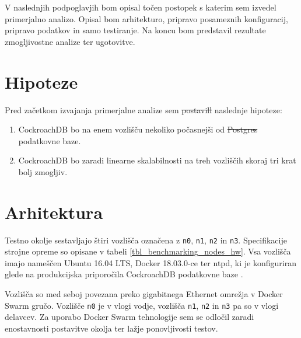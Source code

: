 \documentclass[a4paper, 12pt]{book}
\providecommand{\DIFaddtex}[1]{{\protect\color{blue}\uwave{#1}}} %
\providecommand{\DIFdeltex}[1]{{\protect\color{red}\sout{#1}}}                      %
\providecommand{\DIFaddbegin}{} %
\providecommand{\DIFaddend}{} %
\providecommand{\DIFdelbegin}{} %
\providecommand{\DIFdelend}{} %
\providecommand{\DIFadd}[1]{\texorpdfstring{\DIFaddtex{#1}}{#1}} %
\providecommand{\DIFdel}[1]{\texorpdfstring{\DIFdeltex{#1}}{}} %
\newcommand{\DIFscaledelfig}{0.5}
\newlength{\DIFdelgraphicswidth} %
\newlength{\DIFdelgraphicsheight} %
\newcommand{\DIFaddincludegraphics}[2][]{{\color{blue}\fbox{\DIFOincludegraphics[#1]{#2}}}} %
\newcommand{\DIFdelincludegraphics}[2][]{%
\sbox{\DIFdelgraphicsbox}{\DIFOincludegraphics[#1]{#2}}%
\settoboxwidth{\DIFdelgraphicswidth}{\DIFdelgraphicsbox} %
\settoboxtotalheight{\DIFdelgraphicsheight}{\DIFdelgraphicsbox} %
\scalebox{\DIFscaledelfig}{%
\parbox[b]{\DIFdelgraphicswidth}{\usebox{\DIFdelgraphicsbox}\\[-\baselineskip] \rule{\DIFdelgraphicswidth}{0em}}\llap{\resizebox{\DIFdelgraphicswidth}{\DIFdelgraphicsheight}{%
\setlength{\unitlength}{\DIFdelgraphicswidth}%
\begin{picture}(1,1)%
\thicklines\linethickness{2pt} %
{\color[rgb]{1,0,0}\put(0,0){\framebox(1,1){}}}%
{\color[rgb]{1,0,0}\put(0,0){\line( 1,1){1}}}%
{\color[rgb]{1,0,0}\put(0,1){\line(1,-1){1}}}%
\end{picture}%
}\hspace*{3pt}}} %
} %
\DeclareRobustCommand{\DIFaddbegin}{\DIFOaddbegin \let\includegraphics\DIFaddincludegraphics} %
\DeclareRobustCommand{\DIFaddend}{\DIFOaddend \let\includegraphics\DIFOincludegraphics} %
\DeclareRobustCommand{\DIFdelbegin}{\DIFOdelbegin \let\includegraphics\DIFdelincludegraphics} %
\DeclareRobustCommand{\DIFdelend}{\DIFOaddend \let\includegraphics\DIFOincludegraphics} %
\begin{document}
V naslednjih podpoglavjih bom opisal točen postopek s katerim sem izvedel primerjalno analizo. Opisal bom arhitekturo, pripravo posameznih konfiguracij, pripravo podatkov in samo testiranje. Na koncu bom predstavil rezultate zmogljivostne analize ter ugotovitve.
\DIFdelbegin %
\DIFdelend 

\section{Hipoteze}
Pred začetkom izvajanja primerjalne analize sem \DIFdelbegin \DIFdel{postavill }\DIFdelend \DIFaddbegin \DIFadd{postavil }\DIFaddend naslednje hipoteze:
\begin{enumerate}
    \item CockroachDB bo na enem vozlišču nekoliko počasnejši od \DIFdelbegin \DIFdel{Postgres }\DIFdelend \DIFaddbegin \DIFadd{PostgreSQL }\DIFaddend podatkovne baze.

    \item CockroachDB bo zaradi linearne skalabilnosti na treh vozliščih skoraj tri krat bolj zmogljiv.
\end{enumerate}

\section{Arhitektura}
Testno okolje sestavljajo štiri vozlišča označena z \texttt{n0}, \texttt{n1}, \texttt{n2} in \texttt{n3}. Specifikacije strojne opreme so opisane v tabeli \ref{tbl_benchmarking_nodes_hw}. Vsa vozlišča imajo nameščen Ubuntu 16.04 LTS, Docker 18.03.0-ce ter ntpd, ki je konfiguriran glede na produkcijska priporočila  CockroachDB podatkovne baze \cite{CRDB-ntpd-configuration}.

Vozlišča so med seboj povezana preko gigabitnega Ethernet omrežja v Docker Swarm \cite{Docker-Swarm-Mode} gručo. Vozlišče \texttt{n0} je v vlogi vodje, vozlišča \texttt{n1}, \texttt{n2} in \texttt{n3} pa so v vlogi delavcev. Za uporabo Docker Swarm tehnologije sem se odločil zaradi enostavnosti postavitve okolja ter lažje ponovljivosti testov.
\end{document}
